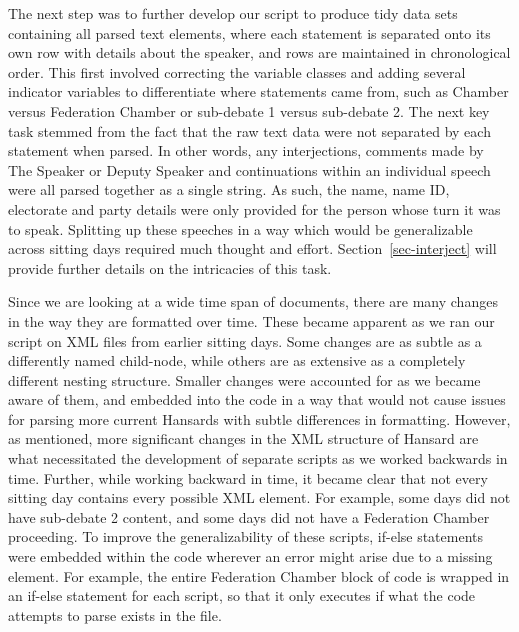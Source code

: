 \documentclass[
  letterpaper,
  DIV=11,
  numbers=noendperiod]{scrartcl}
\begin{document}
The next step was to further develop our script to produce tidy data
sets containing all parsed text elements, where each statement is
separated onto its own row with details about the speaker, and rows are
maintained in chronological order. This first involved correcting the
variable classes and adding several indicator variables to differentiate
where statements came from, such as Chamber versus Federation Chamber or
sub-debate 1 versus sub-debate 2. The next key task stemmed from the
fact that the raw text data were not separated by each statement when
parsed. In other words, any interjections, comments made by The Speaker
or Deputy Speaker and continuations within an individual speech were all
parsed together as a single string. As such, the name, name ID,
electorate and party details were only provided for the person whose
turn it was to speak. Splitting up these speeches in a way which would
be generalizable across sitting days required much thought and effort.
Section~\ref{sec-interject} will provide further details on the
intricacies of this task.

Since we are looking at a wide time span of documents, there are many
changes in the way they are formatted over time. These became apparent
as we ran our script on XML files from earlier sitting days. Some
changes are as subtle as a differently named child-node, while others
are as extensive as a completely different nesting structure. Smaller
changes were accounted for as we became aware of them, and embedded into
the code in a way that would not cause issues for parsing more current
Hansards with subtle differences in formatting. However, as mentioned,
more significant changes in the XML structure of Hansard are what
necessitated the development of separate scripts as we worked backwards
in time. Further, while working backward in time, it became clear that
not every sitting day contains every possible XML element. For example,
some days did not have sub-debate 2 content, and some days did not have
a Federation Chamber proceeding. To improve the generalizability of
these scripts, if-else statements were embedded within the code wherever
an error might arise due to a missing element. For example, the entire
Federation Chamber block of code is wrapped in an if-else statement for
each script, so that it only executes if what the code attempts to parse
exists in the file.
\end{document}
